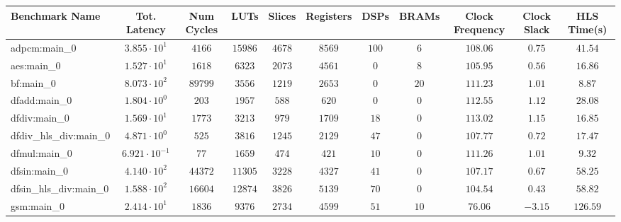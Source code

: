 \begin{tabular}{|l|c|c|c|c|c|c|c|c|c|c|}
\hline
Benchmark Name          & Tot. Latency            & Num Cycles & LUTs      & Slices    & Registers & DSPs    & BRAMs   & Clock Frequency & Clock Slack & HLS Time(s) \\
\hline
adpcm:main\_0           & $ 3.855 \cdot 10^{1}  $ & $ 4166   $ & $ 15986 $ & $ 4678  $ & $ 8569  $ & $ 100 $ & $ 6   $ & $ 108.06      $ & $ 0.75    $ & $ 41.54   $ \\
aes:main\_0             & $ 1.527 \cdot 10^{1}  $ & $ 1618   $ & $ 6323  $ & $ 2073  $ & $ 4561  $ & $ 0   $ & $ 8   $ & $ 105.95      $ & $ 0.56    $ & $ 16.86   $ \\
bf:main\_0              & $ 8.073 \cdot 10^{2}  $ & $ 89799  $ & $ 3556  $ & $ 1219  $ & $ 2653  $ & $ 0   $ & $ 20  $ & $ 111.23      $ & $ 1.01    $ & $ 8.87    $ \\
dfadd:main\_0           & $ 1.804 \cdot 10^{0}  $ & $ 203    $ & $ 1957  $ & $ 588   $ & $ 620   $ & $ 0   $ & $ 0   $ & $ 112.55      $ & $ 1.12    $ & $ 28.08   $ \\
dfdiv:main\_0           & $ 1.569 \cdot 10^{1}  $ & $ 1773   $ & $ 3213  $ & $ 979   $ & $ 1709  $ & $ 18  $ & $ 0   $ & $ 113.02      $ & $ 1.15    $ & $ 16.85   $ \\
dfdiv\_hls\_div:main\_0 & $ 4.871 \cdot 10^{0}  $ & $ 525    $ & $ 3816  $ & $ 1245  $ & $ 2129  $ & $ 47  $ & $ 0   $ & $ 107.77      $ & $ 0.72    $ & $ 17.47   $ \\
dfmul:main\_0           & $ 6.921 \cdot 10^{-1} $ & $ 77     $ & $ 1659  $ & $ 474   $ & $ 421   $ & $ 10  $ & $ 0   $ & $ 111.26      $ & $ 1.01    $ & $ 9.32    $ \\
dfsin:main\_0           & $ 4.140 \cdot 10^{2}  $ & $ 44372  $ & $ 11305 $ & $ 3228  $ & $ 4327  $ & $ 41  $ & $ 0   $ & $ 107.17      $ & $ 0.67    $ & $ 58.25   $ \\
dfsin\_hls\_div:main\_0 & $ 1.588 \cdot 10^{2}  $ & $ 16604  $ & $ 12874 $ & $ 3826  $ & $ 5139  $ & $ 70  $ & $ 0   $ & $ 104.54      $ & $ 0.43    $ & $ 58.82   $ \\
gsm:main\_0             & $ 2.414 \cdot 10^{1}  $ & $ 1836   $ & $ 9376  $ & $ 2734  $ & $ 4599  $ & $ 51  $ & $ 10  $ & $ 76.06       $ & $ -3.15   $ & $ 126.59  $ \\

\end{tabular}
